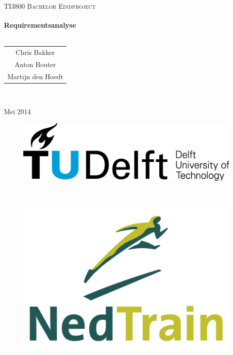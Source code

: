 
\usepackage{tikz}

\pagestyle{fancy}
\begin{titlepage}
\center
\textsc{\huge TI3800 Bachelor Eindproject}\\[1.5cm]
\HRule \\[0.4cm]
{\Huge \bfseries Requirementsanalyse}\\[0.4cm]
\HRule \\[1.5cm]
\begin{Large}
\begin{tabular}{c}
Chris Bakker\\
Anton Bouter\\
Martijn den Hoedt\\
\end{tabular}\\[2cm]
\end{Large}

{\large Mei 2014}\\[2cm]

\begin{figure}[b]
\centering
\begin{minipage}{0.4\textwidth}
\begin{flushleft}
\includegraphics[width=0.9\linewidth]{../images/TU_Delft_logo.png}
\end{flushleft}
\end{minipage}
~
\begin{minipage}{0.4\textwidth}
\begin{flushright}
\includegraphics[width=0.9\linewidth]{../images/NedTrain_logo.png}
\end{flushright}
\end{minipage}\\[2cm]
\end{figure}

\vfill

\end{titlepage}

